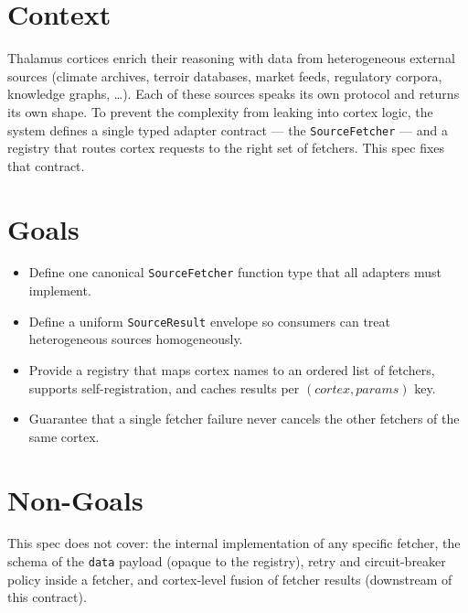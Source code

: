 



\makespecheader

\section{Context}
Thalamus cortices enrich their reasoning with data from heterogeneous external sources
(climate archives, terroir databases, market feeds, regulatory corpora, knowledge graphs, \ldots).
Each of these sources speaks its own protocol and returns its own shape. To prevent the complexity
from leaking into cortex logic, the system defines a single typed adapter contract --- the
\texttt{SourceFetcher} --- and a registry that routes cortex requests to the right set of fetchers.
This spec fixes that contract.

\section{Goals}
\begin{itemize}[leftmargin=1.2em]
  \item Define one canonical \texttt{SourceFetcher} function type that all adapters must implement.
  \item Define a uniform \texttt{SourceResult} envelope so consumers can treat heterogeneous sources homogeneously.
  \item Provide a registry that maps cortex names to an ordered list of fetchers, supports self-registration, and caches results per \((cortex, params)\) key.
  \item Guarantee that a single fetcher failure never cancels the other fetchers of the same cortex.
\end{itemize}

\section{Non-Goals}
\begin{nongoal}
This spec does not cover: the internal implementation of any specific fetcher, the schema of the
\texttt{data} payload (opaque to the registry), retry and circuit-breaker policy inside a fetcher,
and cortex-level fusion of fetcher results (downstream of this contract).
\end{nongoal}

